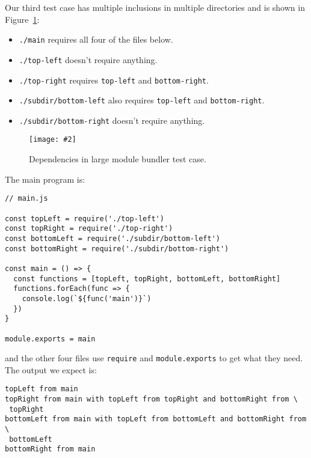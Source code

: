 \documentclass[krantzl]{krantz}
\newcommand{\figpdf}[4]{\begin{figure}%
\centering%
\texttt{[image: \#2]}%
\caption{#3}%
\label{#1}%
\end{figure}}
\newcommand{\figref}[1]{Figure~\ref{#1}}
\begin{document}
Our third test case has multiple inclusions in multiple directories
and is shown in \figref{module-bundler-complicated}:

\begin{itemize}

\item \texttt{./main} requires all four of the files below.

\item \texttt{./top-left} doesn't require anything.

\item \texttt{./top-right} requires \texttt{top-left} and \texttt{bottom-right}.

\item \texttt{./subdir/bottom-left} also requires \texttt{top-left} and \texttt{bottom-right}.

\item \texttt{./subdir/bottom-right} doesn't require anything.

\end{itemize}

\figpdf{module-bundler-complicated}{./module-bundler/complicated.pdf}{Dependencies in large module bundler test case.}{0.6}


\noindent The main program is:


\begin{lstlisting}[frame=single,frameround=tttt]
// main.js

const topLeft = require('./top-left')
const topRight = require('./top-right')
const bottomLeft = require('./subdir/bottom-left')
const bottomRight = require('./subdir/bottom-right')

const main = () => {
  const functions = [topLeft, topRight, bottomLeft, bottomRight]
  functions.forEach(func => {
    console.log(`${func('main')}`)
  })
}

module.exports = main
\end{lstlisting}



\noindent and the other four files use \texttt{require} and \texttt{module.exports} to get what they need.
The output we expect is:


\begin{lstlisting}[frame=single,frameround=tttt]
topLeft from main
topRight from main with topLeft from topRight and bottomRight from \
 topRight
bottomLeft from main with topLeft from bottomLeft and bottomRight from \
 bottomLeft
bottomRight from main
\end{lstlisting}
\end{document}
